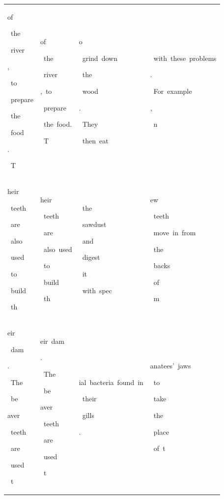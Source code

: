 \begin{table}[h]
\begin{tabular}{ l | l | l | l }
 \colorbox{cm_32!40}{\strut of}\colorbox{cm_33!40}{\strut \ the}\colorbox{cm_30!40}{\strut \ river}\colorbox{cm_31!40}{\strut ,}\colorbox{cm_37!40}{\strut \ to}\colorbox{cm_34!40}{\strut \ prepare}\colorbox{cm_39!40}{\strut \ the}\colorbox{cm_34!40}{\strut \ food}\colorbox{cm_32!40}{\strut .}\colorbox{cm_31!40}{\strut \ T} & \colorbox{cm_12!40}{\strut of}\colorbox{cm_25!40}{\strut \ the}\colorbox{cm_0!40}{\strut \ river}\colorbox{cm_12!40}{\strut ,\ to}\colorbox{cm_0!40}{\strut \ prepare}\colorbox{cm_12!40}{\strut \ the\ food.}\colorbox{cm_25!40}{\strut \ T} & \colorbox{cm_12!40}{\strut o}\colorbox{cm_0!40}{\strut \ grind\ down}\colorbox{cm_12!40}{\strut \ the}\colorbox{cm_25!40}{\strut \ wood}\colorbox{cm_12!40}{\strut .}\colorbox{cm_25!40}{\strut \ They}\colorbox{cm_0!40}{\strut \ then\ eat} & \colorbox{cm_0!40}{\strut \ with\ these\ problems}\colorbox{cm_12!40}{\strut .}\colorbox{cm_0!40}{\strut \ For\ example}\colorbox{cm_12!40}{\strut ,}\colorbox{cm_0!40}{\strut \ n} \\ 
 \colorbox{cm_31!40}{\strut heir}\colorbox{cm_30!40}{\strut \ teeth}\colorbox{cm_31!40}{\strut \ are}\colorbox{cm_30!40}{\strut \ also}\colorbox{cm_24!40}{\strut \ used}\colorbox{cm_32!40}{\strut \ to}\colorbox{cm_29!40}{\strut \ build}\colorbox{cm_20!40}{\strut \ th} & \colorbox{cm_25!40}{\strut heir}\colorbox{cm_12!40}{\strut \ teeth}\colorbox{cm_25!40}{\strut \ are}\colorbox{cm_12!40}{\strut \ also\ used}\colorbox{cm_25!40}{\strut \ to}\colorbox{cm_12!40}{\strut \ build}\colorbox{cm_25!40}{\strut \ th} & \colorbox{cm_12!40}{\strut \ the}\colorbox{cm_0!40}{\strut \ sawdust}\colorbox{cm_12!40}{\strut \ and}\colorbox{cm_0!40}{\strut \ digest}\colorbox{cm_12!40}{\strut \ it}\colorbox{cm_0!40}{\strut \ with\ spec} & \colorbox{cm_0!40}{\strut ew}\colorbox{cm_12!40}{\strut \ teeth}\colorbox{cm_0!40}{\strut \ move\ in\ from}\colorbox{cm_12!40}{\strut \ the}\colorbox{cm_0!40}{\strut \ backs}\colorbox{cm_12!40}{\strut \ of}\colorbox{cm_0!40}{\strut \ m} \\ 
 \colorbox{cm_20!40}{\strut eir}\colorbox{cm_27!40}{\strut \ dam}\colorbox{cm_29!40}{\strut .}\colorbox{cm_32!40}{\strut \ The}\colorbox{cm_41!40}{\strut \ be}\colorbox{cm_27!40}{\strut aver}\colorbox{cm_32!40}{\strut \ teeth}\colorbox{cm_17!40}{\strut \ are}\colorbox{cm_27!40}{\strut \ used}\colorbox{cm_19!40}{\strut \ t} & \colorbox{cm_25!40}{\strut eir\ dam}\colorbox{cm_12!40}{\strut .}\colorbox{cm_25!40}{\strut \ The}\colorbox{cm_12!40}{\strut \ be}\colorbox{cm_25!40}{\strut aver}\colorbox{cm_12!40}{\strut \ teeth}\colorbox{cm_25!40}{\strut \ are}\colorbox{cm_38!40}{\strut \ used}\colorbox{cm_51!40}{\strut \ t} & \colorbox{cm_0!40}{\strut ial\ bacteria\ found\ in}\colorbox{cm_12!40}{\strut \ their}\colorbox{cm_0!40}{\strut \ gills}\colorbox{cm_12!40}{\strut .}\colorbox{cm_0!40}{\strut } & \colorbox{cm_0!40}{\strut anatees'\ jaws}\colorbox{cm_12!40}{\strut \ to}\colorbox{cm_0!40}{\strut \ take}\colorbox{cm_12!40}{\strut \ the}\colorbox{cm_0!40}{\strut \ place}\colorbox{cm_12!40}{\strut \ of\ t} \\ 

\end{tabular}
\end{table}
